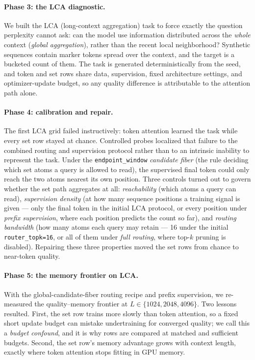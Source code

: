 \documentclass{article}
\theoremstyle{plain}
\theoremstyle{definition}
\theoremstyle{remark}
\begin{document}
\paragraph{Phase 3: the LCA diagnostic.}  We built the LCA (long-context
aggregation) task to force exactly the question perplexity cannot ask: can
the model use information distributed across the \emph{whole} context
(\emph{global aggregation}), rather than the recent local neighborhood?
Synthetic sequences contain marker tokens spread over the context, and the
target is a bucketed count of them.  The task is generated deterministically
from the seed, and token and set rows share data, supervision, fixed
architecture settings, and optimizer-update budget, so any quality
difference is attributable to the attention path alone.

\paragraph{Phase 4: calibration and repair.}  The first LCA grid failed
instructively: token attention learned the task while every set row stayed
at chance.  Controlled probes localized that failure to the combined routing
and supervision protocol rather than to an intrinsic inability to represent
the task.  Under the \texttt{endpoint\_window} \emph{candidate fiber}
(the rule deciding which set atoms a query is allowed to read), the
supervised final token could only reach the two atoms nearest its own
position.  Three controls turned out to govern whether the
set path aggregates at all: \emph{reachability} (which atoms a query can
read), \emph{supervision density} (at how many sequence positions a training
signal is given --- only the final token in the initial LCA protocol, or
every position under \emph{prefix supervision}, where each position predicts
the count so far), and \emph{routing bandwidth} (how many atoms each query
may retain --- 16 under the initial \texttt{router\_topk=16}, or all of them
under \emph{full routing}, where top-$k$ pruning is disabled).  Repairing
these three properties moved the set rows from chance to near-token quality.

\paragraph{Phase 5: the memory frontier on LCA.}  With the
global-candidate-fiber routing recipe and prefix supervision, we re-measured the
quality--memory frontier at
$L\in\{1024,2048,4096\}$.  Two lessons resulted.  First, the set row trains
more slowly than token attention, so a fixed short update budget can mistake
undertraining for converged quality; we call this a \emph{budget confound},
and it is why rows are compared at matched and sufficient budgets.  Second,
the set row's memory advantage grows with context length, exactly where
token attention stops fitting in GPU memory.
\end{document}
